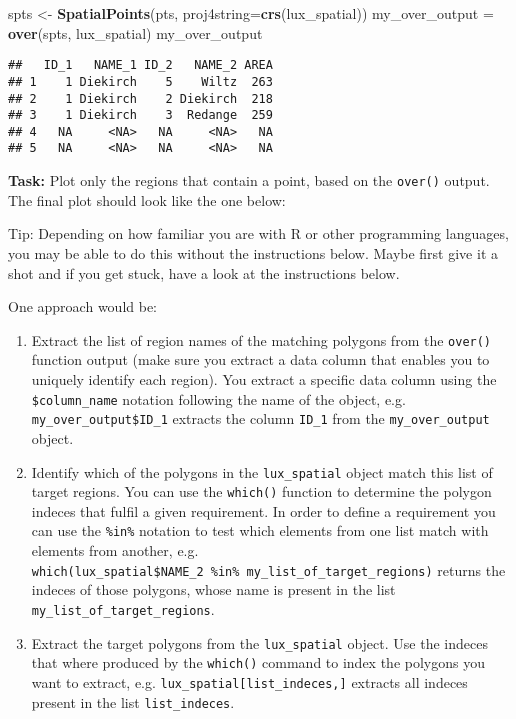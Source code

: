 \documentclass[]{article}
\newenvironment{Shaded}{\begin{snugshade}}{\end{snugshade}}
\newcommand{\DataTypeTok}[1]{\textcolor[rgb]{0.13,0.29,0.53}{#1}}
\newcommand{\KeywordTok}[1]{\textcolor[rgb]{0.13,0.29,0.53}{\textbf{#1}}}
\newcommand{\NormalTok}[1]{#1}
\newcommand{\StringTok}[1]{\textcolor[rgb]{0.31,0.60,0.02}{#1}}
\begin{document}
\begin{Shaded}
\begin{Highlighting}[]
\NormalTok{spts <-}\StringTok{ }\KeywordTok{SpatialPoints}\NormalTok{(pts, }\DataTypeTok{proj4string=}\KeywordTok{crs}\NormalTok{(lux_spatial))}
\NormalTok{my_over_output =}\StringTok{ }\KeywordTok{over}\NormalTok{(spts, lux_spatial)}
\NormalTok{my_over_output}
\end{Highlighting}
\end{Shaded}

\begin{verbatim}
##   ID_1   NAME_1 ID_2   NAME_2 AREA
## 1    1 Diekirch    5    Wiltz  263
## 2    1 Diekirch    2 Diekirch  218
## 3    1 Diekirch    3  Redange  259
## 4   NA     <NA>   NA     <NA>   NA
## 5   NA     <NA>   NA     <NA>   NA
\end{verbatim}

\textbf{Task:} Plot only the regions that contain a point, based on the
\texttt{over()} output. The final plot should look like the one below:

Tip: Depending on how familiar you are with R or other programming
languages, you may be able to do this without the instructions below.
Maybe first give it a shot and if you get stuck, have a look at the
instructions below.

One approach would be:

\begin{enumerate}
\def\labelenumi{\arabic{enumi}.}
\item
  Extract the list of region names of the matching polygons from the
  \texttt{over()} function output (make sure you extract a data column
  that enables you to uniquely identify each region). You extract a
  specific data column using the \texttt{\$column\_name} notation
  following the name of the object, e.g.
  \texttt{my\_over\_output\$ID\_1} extracts the column \texttt{ID\_1}
  from the \texttt{my\_over\_output} object.
\item
  Identify which of the polygons in the \texttt{lux\_spatial} object
  match this list of target regions. You can use the \texttt{which()}
  function to determine the polygon indeces that fulfil a given
  requirement. In order to define a requirement you can use the
  \texttt{\%in\%} notation to test which elements from one list match
  with elements from another, e.g.
  \texttt{which(lux\_spatial\$NAME\_2\ \%in\%\ my\_list\_of\_target\_regions)}
  returns the indeces of those polygons, whose name is present in the
  list \texttt{my\_list\_of\_target\_regions}.
\item
  Extract the target polygons from the \texttt{lux\_spatial} object. Use
  the indeces that where produced by the \texttt{which()} command to
  index the polygons you want to extract, e.g.
  \texttt{lux\_spatial{[}list\_indeces,{]}} extracts all indeces present
  in the list \texttt{list\_indeces}.
\end{enumerate}
\end{document}
